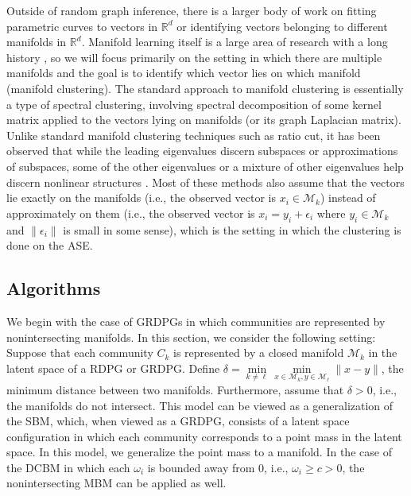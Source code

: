 \documentclass[
  12pt,
]{article}
\theoremstyle{definition}
\theoremstyle{definition}
\theoremstyle{definition}
\theoremstyle{definition}
\theoremstyle{remark}
\begin{document}
Outside of random graph inference, there is a larger body of work on fitting parametric curves to vectors in \(\mathbb{R}^d\) or identifying vectors belonging to different manifolds in \(\mathbb{R}^d\).
Manifold learning itself is a large area of research with a long history \citep{Tenenbaum2000-ff, 10945-32767, trosset2020rehabilitating, https://doi.org/10.48550/arxiv.2107.08089}, so we will focus primarily on the setting in which there are multiple manifolds and the goal is to identify which vector lies on which manifold (manifold clustering).
The standard approach to manifold clustering is essentially a type of spectral clustering, involving spectral decomposition of some kernel matrix applied to the vectors lying on manifolds (or its graph Laplacian matrix).
Unlike standard manifold clustering techniques such as ratio cut, it has been observed that while the leading eigenvalues discern subspaces or approximations of subspaces, some of the other eigenvalues or a mixture of other eigenvalues help discern nonlinear structures \citep{https://doi.org/10.48550/arxiv.2208.11665, https://doi.org/10.48550/arxiv.2201.10000}.
Most of these methods also assume that the vectors lie exactly on the manifolds (i.e., the observed vector is \(x_i \in \mathcal{M}_k\)) instead of approximately on them (i.e., the observed vector is \(x_i = y_i + \epsilon_i\) where \(y_i \in \mathcal{M}_k\) and \(\| \epsilon_i \|\) is small in some sense), which is the setting in which the clustering is done on the ASE.

\hypertarget{sec:nonintersect}{%
\subsection{Algorithms}\label{sec:nonintersect}}

We begin with the case of GRDPGs in which communities are represented by nonintersecting manifolds.
In this section, we consider the following setting: Suppose that each community \(C_k\) is represented by a closed manifold \(\mathcal{M}_k\) in the latent space of a RDPG or GRDPG.
Define \(\delta = \min\limits_{k \neq \ell} \min\limits_{x \in \mathcal{M}_k, y \in \mathcal{M}_\ell} \|x - y\|\), the minimum distance between two manifolds.
Furthermore, assume that \(\delta > 0\), i.e., the manifolds do not intersect.
This model can be viewed as a generalization of the SBM, which, when viewed as a GRDPG, consists of a latent space configuration in which each community corresponds to a point mass in the latent space.
In this model, we generalize the point mass to a manifold.
In the case of the DCBM in which each \(\omega_i\) is bounded away from 0, i.e., \(\omega_i \geq c > 0\), the nonintersecting MBM can be applied as well.
\end{document}
